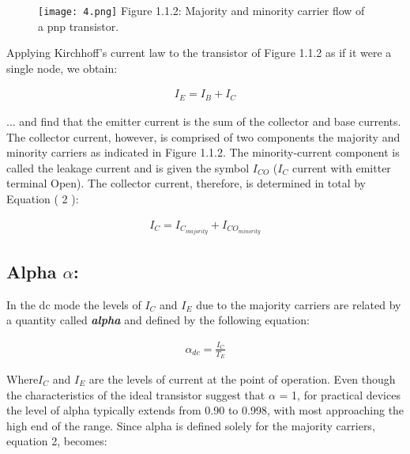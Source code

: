 \begin{figure}[H]
\texttt{[image: 4.png]}
\centering \linebreak \linebreak Figure 1.1.2: Majority and minority carrier flow of a pnp transistor.
\end{figure}

Applying Kirchhoff’s current law to the transistor of Figure 1.1.2 as if it were a single node, we obtain:

\begin{ceqn}
\begin{align}
I_{E} = I_{B} + I_{C}
\end{align}
\end{ceqn}

... and find that the emitter current is the sum of the collector and base currents. The collector current, however, is comprised of two components the majority and minority carriers as indicated in Figure 1.1.2. The minority-current component is called the leakage current and is given the symbol $I_{CO}$ ($I_{C}$ current with emitter terminal Open). The collector current, therefore, is determined in total by Equation ( 2 ):

\begin{ceqn}
\begin{align}
I_{C} = I_{C_{majority}} + I_{CO_{minority}}
\end{align}
\end{ceqn}

\subsection{Alpha $\alpha$:}

In the dc mode the levels of $I_{C}$ and $I_{E}$ due to the majority carriers are related by a quantity called {	\bfseries\itshape alpha} and defined by the following equation:

\begin{ceqn}
\begin{align}
\alpha_{dc} =\frac{I_{C}}{T_{E}}
\end{align}
\end{ceqn}

Where$I_{C}$ and $I_{E}$ are the levels of current at the point of operation. Even though the characteristics of the ideal transistor suggest that $\alpha$ = 1, for practical devices the level of alpha typically extends from 0.90 to 0.998, with most approaching the high end of the range. Since alpha is defined solely for the majority carriers, equation 2, becomes:

